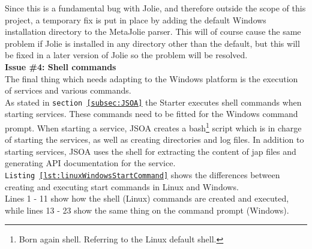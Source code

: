 \documentclass[12pt,a4paper]{article}
\begin{document}
Since this is a fundamental bug with Jolie, and therefore outside the scope of this project, a temporary fix is put in place by adding the default Windows installation directory to the MetaJolie parser. This will of course cause the same problem if Jolie is installed in any directory other than the default, but this will be fixed in a later version of Jolie so the problem will be resolved.\\

\textbf{Issue \#4: Shell commands} \\
The final thing which needs adapting to the Windows platform is the execution of services and various commands. \\
As stated in \texttt{section \ref{subsec:JSOA}} the Starter executes shell commands when starting services. These commands need to be fitted for the Windows command prompt.
When starting a service, JSOA creates a bash\footnote{Born again shell. Referring to the Linux default shell.} script which is in charge of starting the services, as well as creating directories and log files. In addition to starting services, JSOA uses the shell for extracting the content of jap files and generating API documentation for the service.\\
\texttt{Listing \ref{lst:linuxWindowsStartCommand}} shows the differences between creating and executing start commands in Linux and Windows.\\
Lines 1 - 11 show how the shell (Linux) commands are created and executed, while lines 13 - 23 show the same thing on the command prompt (Windows).
\end{document}
